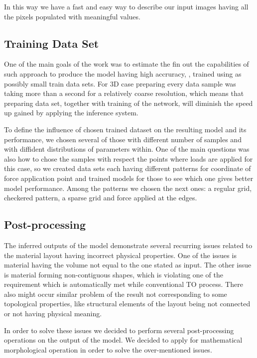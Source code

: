 In this way we have a fast and easy way to describe our input images having all the pixels populated with meaningful values.

\subsection{Training Data Set}

One of the main goals of the work was to estimate the fin out the capabilities of such approach to produce the model having high accruracy, , trained using as possibly small train data sets.
For 3D case preparing every data sample was taking more than a second for a relatively coarse resolution, which means that preparing data set, together with training of the network, will diminish the speed up gained by applying the inference system.  

To define the influence of chosen trained dataset on the resulting model and its performance, we chosen several of those with different number of samples and with diffident distributions of parameters within. 
One of the main questions was also how to chose the samples with respect the points where loads are applied for this case, so we created data sets each having different patterns for coordinate of force application point and trained models for those to see which one gives better model performance.
Among the patterns we chosen the next ones: a regular grid, checkered pattern, a sparse grid and force applied at the edges.


 
 
\subsection{Post-processing}

The inferred outputs of the model demonstrate several recurring issues related to the material layout having incorrect physical properties.
One of the issues is material having the volume not equal to the one stated as input.
The other issue is material forming non-contiguous shapes, which is violating one of the requirement which is automatically met while conventional TO process.
There also might occur similar problem of the result not corresponding to some topological properties, like structural elements of the layout being not connected or not having physical meaning.
\medskip

In order to solve these issues we decided to perform several post-processing operations on the output of the model.
We decided to apply for mathematical morphological operation in order to solve the over-mentioned issues.
\medskip

